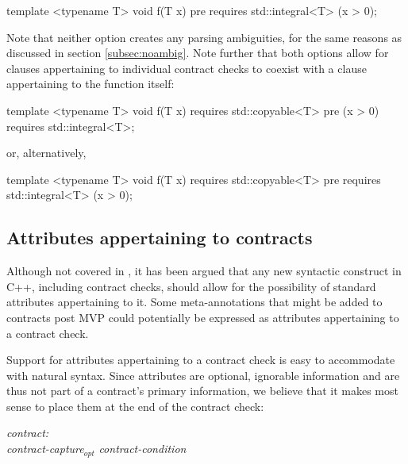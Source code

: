 \begin{codeblock}
template <typename T>
void f(T x)
  pre requires std::integral<T> (x > 0);
\end{codeblock}

Note that neither option creates any parsing ambiguities, for the same reasons as discussed in section \ref{subsec:noambig}. Note further that both options allow for  clauses appertaining to individual contract checks to coexist with a  clause appertaining to the function itself:

\begin{codeblock}
template <typename T>
void f(T x)
  requires std::copyable<T>
  pre (x > 0) requires std::integral<T>;
\end{codeblock}

or, alternatively,

\begin{codeblock}
template <typename T>
void f(T x)
  requires std::copyable<T>
  pre requires std::integral<T> (x > 0);
\end{codeblock}


\subsection{Attributes appertaining to contracts}
\label{subsec:attr}

Although not covered in \cite{P2885R3}, it has been argued that any new syntactic construct in C++, including contract checks, should allow for the possibility of standard attributes appertaining to it. Some meta-annotations that might be added to contracts post MVP could potentially be expressed as attributes appertaining to a contract check.

Support for attributes appertaining to a contract check is easy to accommodate with natural syntax. Since attributes are optional, ignorable information and are thus not part of a contract's primary information, we believe that it makes most sense to place them at the end of the contract check:

\begin{adjustwidth}{0.5cm}{0.5cm}

\emph{contract:} \\
\phantom{~~~}\emph{contract-capture}$_{opt}$ \emph{contract-condition} 

\end{adjustwidth}

